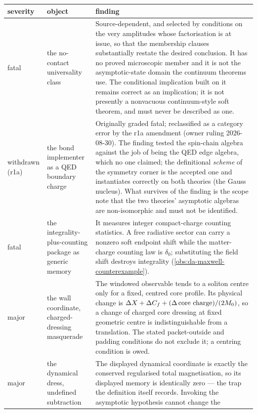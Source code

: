 \begin{center}
\begin{tabular}{@{}p{}p{}p{}@{}}
\toprule
\textbf{severity} & \textbf{object} & \textbf{finding} \\
\midrule
fatal &
the no-contact universality class &
Source-dependent, and selected by conditions on the very amplitudes whose
factorisation is at issue, so that the membership clauses substantially restate
the desired conclusion. It has no proved microscopic member and it is not the
asymptotic-state domain the continuum theorems use. The conditional implication
built on it remains correct as an implication; it is not presently a nonvacuous
continuum-style soft theorem, and must never be described as one. \\
\midrule
withdrawn (r1a) &
the bond implementer as a QED boundary charge &
Originally graded fatal; reclassified as a category error by the r1a
amendment (owner ruling 2026-08-30). The finding tested the spin-chain
algebra against the job of being the QED edge algebra, which no one claimed;
the definitional \emph{scheme} of the symmetry corner is the accepted one
and instantiates correctly on both theories (the Gauss nucleus). What
survives of the finding is the scope note that the two theories' asymptotic
algebras are non-isomorphic and must not be identified. \\
\midrule
fatal &
the integrality-plus-counting package as generic memory &
It measures integer compact-charge counting statistics. A free radiative sector
can carry a nonzero soft endpoint shift while the matter-charge counting law is
$\delta_0$; substituting the field shift destroys integrality
(\cref{obs:da-maxwell-counterexample}). \\
\midrule
major &
the wall coordinate, charged-dressing masquerade &
The windowed observable tends to a soliton centre only for a fixed, centred core
profile. Its physical change is
$\Delta X+\Delta C_f+(\Delta\,\text{core charge})/(2M_{0})$, so a change of
charged core dressing at fixed geometric centre is indistinguishable from a
translation. The stated packet-outside and padding conditions do not exclude it;
a centring condition is owed. \\
\midrule
major &
the dynamical dress, undefined subtraction &
The displayed dynamical coordinate is exactly the conserved regularised total
magnetisation, so its displayed memory is identically zero --- the trap the
definition itself records. Invoking the asymptotic hypothesis cannot change the

\end{tabular}
\end{center}
